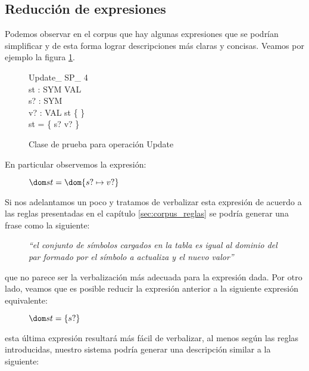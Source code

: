 \subsection*{Reducción de expresiones}
Podemos observar en el corpus que hay algunas expresiones que se podrían simplificar y de esta forma lograr descripciones más claras y concisas. Veamos por ejemplo la figura \ref{fig:ej_update_sp_4}.

\begin{figure}[H]
  \centering
  \begin{schema}{Update\_ SP\_ 4}\\
   st : SYM \pfun VAL \\
   s? : SYM \\
   v? : VAL 
  \where
   st \neq \{ \} \\
   \dom st = \dom \{ s? \mapsto v? \}
  \end{schema}
  \caption[]{Clase de prueba para operación Update\footnotemark}
  \label{fig:ej_update_sp_4}
\end{figure}

En particular observemos la expresión:

\begin{figure}[H]
  \centering
  $\dom st = \dom \{ s? \mapsto v? \}$ 
\end{figure}

Si nos adelantamos un poco y tratamos de verbalizar esta expresión de acuerdo a las reglas presentadas en el capítulo \ref{sec:corpus_reglas} se podría generar una frase como la siguiente:

\begin{figure}[H]
  \centering
  \emph{``el conjunto de símbolos cargados en la tabla es igual al dominio del par formado por el símbolo a actualiza y el nuevo valor''}
\end{figure}

\noindent
que no parece ser la verbalización más adecuada para la expresión dada. Por otro lado, veamos que es posible reducir la expresión anterior a la siguiente expresión equivalente:

\begin{figure}[H]
  \centering
  $\dom st = \{s?\}$ 
\end{figure}

\noindent
esta última expresión resultará más fácil de verbalizar, al menos según las reglas introducidas, nuestro sistema podría generar una descripción similar a la siguiente:

